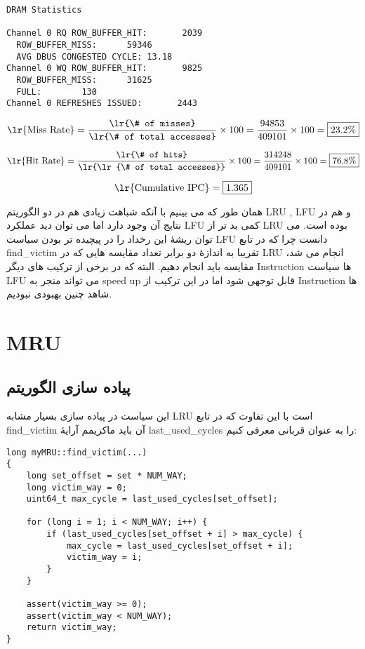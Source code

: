 \documentclass[17pt]{article}
\begin{document}
\begin{LTR}
\begin{lstlisting}[basicstyle=\tiny\ttfamily]
DRAM Statistics

Channel 0 RQ ROW_BUFFER_HIT:       2039
  ROW_BUFFER_MISS:      59346
  AVG DBUS CONGESTED CYCLE: 13.18
Channel 0 WQ ROW_BUFFER_HIT:       9825
  ROW_BUFFER_MISS:      31625
  FULL:        130
Channel 0 REFRESHES ISSUED:       2443
\end{lstlisting}
\end{LTR}

\begin{center}
\[
\text{\lr{Miss Rate}} = \frac{\text{\lr{\# of misses}}}{\text{\lr{\# of total accesses}}} \times 100 = \frac{94853}{409101} \times 100 = \boxed{23.2\%}
\]

\vspace{0.2cm} %

\[
\text{\lr{Hit Rate}} = \frac{\text{\lr{\# of hits}}}{\text{\lr{\lr{\# of total accesses}}}} \times 100 = \frac{314248}{409101} \times 100 = \boxed{76.8\%}
\]

\vspace{0.2cm} %

\[
\text{\lr{Cumulative IPC}} = \boxed{1.365}
\]
\end{center}

همان طور که می بینیم با آنکه شباهت زیادی هم در دو الگوریتم LRU , LFU و هم در نتایج آن وجود دارد اما می توان دید عملکرد LFU کمی بد تر از LRU بوده است. می توان ریشهٔ این رخداد را در پیچیده تر بودن سیاست LFU دانست چرا که در تابع find\_victim تقریبا به اندازهٔ دو برابر تعداد مقایسه هایی که در LRU انجام می شد، مقایسه باید انجام دهیم. البته که در برخی از ترکیب های دیگر Instruction ها سیاست LFU می تواند منجر به speed up قابل توجهی شود اما در این ترکیب از Instruction ها شاهد چنین بهبودی نبودیم.

\section{MRU}
\subsection{پیاده سازی الگوریتم}
این سیاست در پیاده سازی بسیار مشابه LRU است با این تفاوت که در تابع find\_victim آن باید ماکزیمم آرایهٔ last\_used\_cycles را به عنوان قربانی معرفی کنیم:

\begin{LTR}
\begin{lstlisting}
long myMRU::find_victim(...)
{
    long set_offset = set * NUM_WAY;
    long victim_way = 0;
    uint64_t max_cycle = last_used_cycles[set_offset];

    for (long i = 1; i < NUM_WAY; i++) {
        if (last_used_cycles[set_offset + i] > max_cycle) {
            max_cycle = last_used_cycles[set_offset + i];
            victim_way = i;
        }
    }

    assert(victim_way >= 0);
    assert(victim_way < NUM_WAY);
    return victim_way;
}
\end{lstlisting}
\end{LTR}
\end{document}
